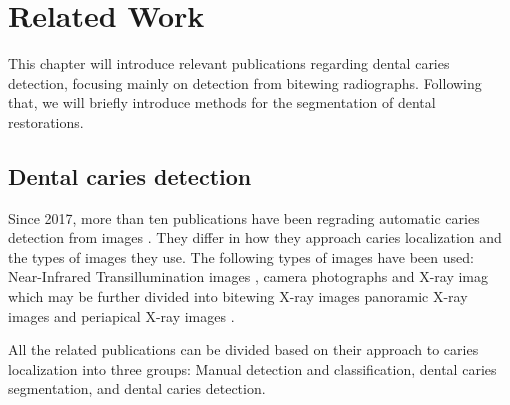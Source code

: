 \chapter{Related Work}
This chapter will introduce relevant publications regarding dental caries detection, focusing mainly on detection from bitewing radiographs. Following that, we will briefly introduce methods for the segmentation of dental restorations.

\section{Dental caries detection}
Since 2017, more than ten publications have been regrading automatic caries detection from images \cite{PradosPrivado2020}. They differ in how they approach caries localization and the types of images they use. The following types of images have been used: Near-Infrared Transillumination images \cite{Casalegno2019,Schwendicke2020}, camera photographs \cite{Moutselos2019} and X-ray imag which may be further divided into bitewing X-ray images \cite{Moran2021, Cantu2020, Bayrakdar2021, Mao2021, Srivastava2017} panoramic X-ray images \cite{Lian2021} and periapical X-ray images \cite{Lee2018}.

All the related publications can be divided based on their approach to caries localization into three groups: Manual detection and classification, dental caries segmentation, and dental caries detection.

